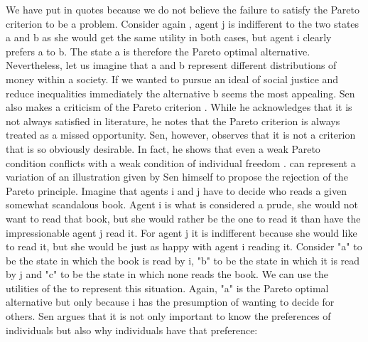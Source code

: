 We have put  in quotes because we do not believe the failure to satisfy the Pareto criterion to be a problem.
Consider again , agent j is indifferent to the two states a and b as she would get the same utility in both cases, but agent i clearly prefers a to b. The state a is therefore the Pareto optimal alternative. Nevertheless, let us imagine that a and b represent different distributions of money within a society. If we wanted to pursue an ideal of social justice and reduce inequalities immediately the alternative b seems the most appealing.
Sen also makes a criticism of the Pareto criterion \cite[Chapter 6]{Sen2017}. While he acknowledges that it is not always satisfied in literature, he notes that the Pareto criterion is always treated as a missed opportunity. Sen, however, observes that it is not a criterion that is so obviously desirable. In fact, he shows that even a weak Pareto condition conflicts with a weak condition of individual freedom \cite[Theorem 6*3]{Sen2017}.
 can represent a variation of an illustration given by Sen himself to propose the rejection of the Pareto principle. Imagine that agents i and j have to decide who reads a given somewhat scandalous book. Agent i is what is considered a prude, she would not want to read that book, but she would rather be the one to read it than have the impressionable agent j read it. For agent j it is indifferent because she would like to read it, but she would be just as happy with agent i reading it. Consider "a" to be the state in which the book is read by i, "b" to be the state in which it is read by j and "c" to be the state in which none reads the book. We can use the utilities of the  to represent this situation.
Again, "a" is the Pareto optimal alternative but only because i has the presumption of wanting to decide for others. Sen argues that it is not only important to know the preferences of individuals but also why individuals have that preference:
 \cite[Chapter 6.5]{Sen2017}


